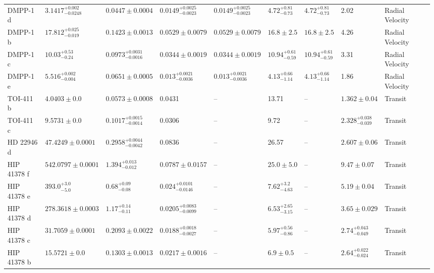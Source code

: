 \begin{tabular}{llllllllll}
DMPP-1 d & $3.1417^{+0.002}_{-0.0248}$ & $0.0447 \pm 0.0004$ & $0.0149^{+0.0025}_{-0.0023}$ & $0.0149^{+0.0025}_{-0.0023}$ & $4.72^{+0.81}_{-0.73}$ & $4.72^{+0.81}_{-0.73}$ & 2.02 & Radial Velocity & \cite{STANDING_ET_AL_2026} \\
DMPP-1 b & $17.812^{+0.025}_{-0.019}$ & $0.1423 \pm 0.0013$ & $0.0529 \pm 0.0079$ & $0.0529 \pm 0.0079$ & $16.8 \pm 2.5$ & $16.8 \pm 2.5$ & 4.26 & Radial Velocity & \cite{STANDING_ET_AL_2026} \\
DMPP-1 c & $10.03^{+0.53}_{-0.24}$ & $0.0973^{+0.0031}_{-0.0016}$ & $0.0344 \pm 0.0019$ & $0.0344 \pm 0.0019$ & $10.94^{+0.61}_{-0.59}$ & $10.94^{+0.61}_{-0.59}$ & 3.31 & Radial Velocity & \cite{STANDING_ET_AL_2026} \\
DMPP-1 e & $5.516^{+0.002}_{-0.004}$ & $0.0651 \pm 0.0005$ & $0.013^{+0.0021}_{-0.0036}$ & $0.013^{+0.0021}_{-0.0036}$ & $4.13^{+0.66}_{-1.14}$ & $4.13^{+0.66}_{-1.14}$ & 1.86 & Radial Velocity & \cite{STAAB_ET_AL__2020} \\
TOI-411 b & $4.0403 \pm 0.0$ & $0.0573 \pm 0.0008$ & 0.0431 & -- & 13.71 & -- & $1.362 \pm 0.04$ & Transit & \cite{GARAI_ET_AL__2023} \\
TOI-411 c & $9.5731 \pm 0.0$ & $0.1017^{+0.0015}_{-0.0014}$ & 0.0306 & -- & 9.72 & -- & $2.328^{+0.038}_{-0.039}$ & Transit & \cite{GARAI_ET_AL__2023} \\
HD 22946 d & $47.4249 \pm 0.0001$ & $0.2958^{+0.0044}_{-0.0042}$ & 0.0836 & -- & 26.57 & -- & $2.607 \pm 0.06$ & Transit & \cite{GARAI_ET_AL__2023} \\
HIP 41378 f & $542.0797 \pm 0.0001$ & $1.394^{+0.013}_{-0.012}$ & $0.0787 \pm 0.0157$ & -- & $25.0 \pm 5.0$ & -- & $9.47 \pm 0.07$ & Transit & \cite{GROUFFAL_ET_AL_2026} \\
HIP 41378 e & $393.0^{+3.0}_{-5.0}$ & $0.68^{+0.09}_{-0.08}$ & $0.024^{+0.0101}_{-0.0146}$ & -- & $7.62^{+3.2}_{-4.63}$ & -- & $5.19 \pm 0.04$ & Transit & \cite{GROUFFAL_ET_AL_2026} \\
HIP 41378 d & $278.3618 \pm 0.0003$ & $1.17^{+0.14}_{-0.11}$ & $0.0205^{+0.0083}_{-0.0099}$ & -- & $6.53^{+2.65}_{-3.15}$ & -- & $3.65 \pm 0.029$ & Transit & \cite{GROUFFAL_ET_AL_2026} \\
HIP 41378 c & $31.7059 \pm 0.0001$ & $0.2093 \pm 0.0022$ & $0.0188^{+0.0018}_{-0.0027}$ & -- & $5.97^{+0.56}_{-0.86}$ & -- & $2.74^{+0.043}_{-0.049}$ & Transit & \cite{GROUFFAL_ET_AL_2026} \\
HIP 41378 b & $15.5721 \pm 0.0$ & $0.1303 \pm 0.0013$ & $0.0217 \pm 0.0016$ & -- & $6.9 \pm 0.5$ & -- & $2.64^{+0.022}_{-0.024}$ & Transit & \cite{GROUFFAL_ET_AL_2026} \\

\end{tabular}
